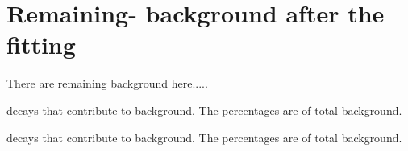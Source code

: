 \chapter{Remaining-\texorpdfstring{\BB}{BB} background after the \texorpdfstring{\Mbc}{Mbc} fitting}\label{sec:appendix_remaining_bb}

There are remaining background here.....

\begin{table}[htbp!]
    \caption{\label{tab:leftover_bp}\Bp decays that contribute to background. The percentages are of total \Bp background.}
    
\end{table}

\begin{table}[htbp!]
    \caption{\label{tab:leftover_bz}\Bz decays that contribute to background. The percentages are of total \Bz background.}
    
\end{table}